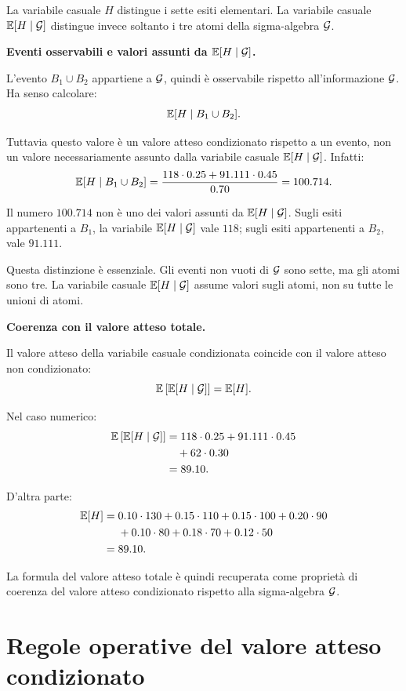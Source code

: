 La variabile casuale $H$ distingue i sette esiti elementari. La variabile
casuale $\mathbb{E}[H\mid\mathcal{G}]$ distingue invece soltanto i tre atomi
della sigma-algebra $\mathcal{G}$.

\medskip

\noindent
\textbf{Eventi osservabili e valori assunti da $\mathbb{E}[H\mid\mathcal{G}]$.}

L'evento $B_1\cup B_2$ appartiene a $\mathcal{G}$, quindi \`{e} osservabile
rispetto all'informazione $\mathcal{G}$. Ha senso calcolare:
\[
\mathbb{E}[H\mid B_1\cup B_2].
\]

Tuttavia questo valore \`{e} un valore atteso condizionato rispetto a un
evento, non un valore necessariamente assunto dalla variabile casuale
$\mathbb{E}[H\mid\mathcal{G}]$. Infatti:
\[
\mathbb{E}[H\mid B_1\cup B_2]
=
\frac{
118\cdot 0.25
+
91.111\cdot 0.45
}
{0.70}
=
100.714.
\]

Il numero $100.714$ non \`{e} uno dei valori assunti da
$\mathbb{E}[H\mid\mathcal{G}]$. Sugli esiti appartenenti a $B_1$, la variabile
$\mathbb{E}[H\mid\mathcal{G}]$ vale $118$; sugli esiti appartenenti a $B_2$,
vale $91.111$.

Questa distinzione \`{e} essenziale. Gli eventi non vuoti di $\mathcal{G}$
sono sette, ma gli atomi sono tre. La variabile casuale
$\mathbb{E}[H\mid\mathcal{G}]$ assume valori sugli atomi, non su tutte le
unioni di atomi.

\medskip

\noindent
\textbf{Coerenza con il valore atteso totale.}

Il valore atteso della variabile casuale condizionata coincide con il valore
atteso non condizionato:
\[
\mathbb{E}\left[
\mathbb{E}[H\mid\mathcal{G}]
\right]
=
\mathbb{E}[H].
\]

Nel caso numerico:
\[
\begin{aligned}
\mathbb{E}\left[
\mathbb{E}[H\mid\mathcal{G}]
\right]
&=118\cdot 0.25+91.111\cdot 0.45\\
&\quad+62\cdot 0.30\\
&=89.10.
\end{aligned}
\]

D'altra parte:
\[
\begin{aligned}
\mathbb{E}[H]
={}&0.10\cdot130+0.15\cdot110+0.15\cdot100+0.20\cdot90\\
&+0.10\cdot80+0.18\cdot70+0.12\cdot50\\
={}&89.10.
\end{aligned}
\]

La formula del valore atteso totale \`{e} quindi recuperata come propriet\`{a}
di coerenza del valore atteso condizionato rispetto alla sigma-algebra
$\mathcal{G}$.

\section{Regole operative del valore atteso condizionato}

